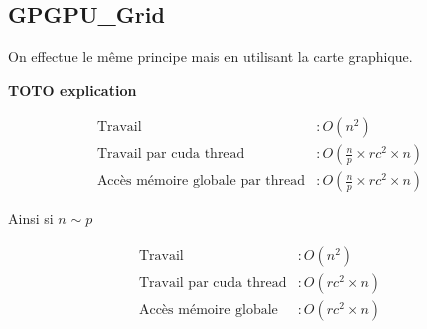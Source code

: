 \documentclass[liens,entete-ensimag,margeCorrection]{ensirapport}
\begin{document}
\subsection{GPGPU\_Grid}
On effectue le même principe mais en utilisant la carte graphique.

\textbf{TOTO explication}

\begin{align*}
    \text{Travail} &: O\left( n^2 \right) \\
    \text{Travail par cuda thread} &: O\left( \frac n p \times rc^2 \times n \right)  \\
    \text{Accès mémoire globale par thread} &: O\left( \frac n p \times rc^2 \times n \right)
\end{align*}

Ainsi si $n \sim p$

\begin{align*}
    \text{Travail} &: O\left( n^2 \right) \\
    \text{Travail par cuda thread} &: O\left( rc^2 \times n \right)  \\
    \text{Accès mémoire globale} &: O\left( rc^2 \times n \right)
\end{align*}
\end{document}
